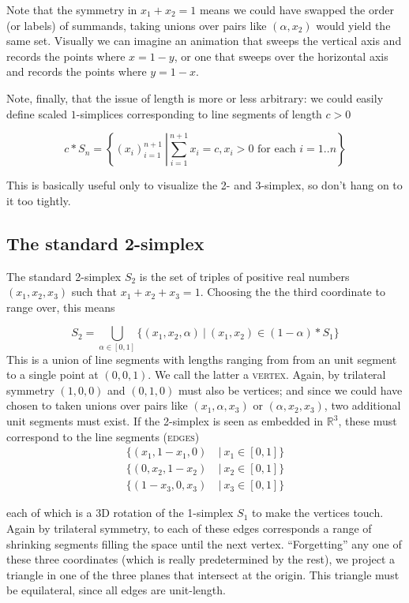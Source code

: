 \documentclass{tufte-handout}
\newcommand{\define}{\textsc}
\newcommand{\re}{\mathbb{R}}
\begin{document}
Note that the symmetry in $x_1+x_2=1$ means we could have swapped the order (or labels) of summands, taking unions over pairs like $(\alpha,x_2)$ would yield the same set. Visually we can imagine an animation that sweeps the vertical axis and records the points where $x=1-y$, or one that sweeps over the horizontal axis and records the points where $y=1-x$.

Note, finally, that the issue of length is more or less arbitrary: we could easily define scaled $1$-simplices corresponding to line segments of length $c>0$
{\[
c * S_n = \left\{(x_i)_{i=1}^{n+1}\ \left| \sum_{i=1}^{n+1} x_i = c\right., x_i > 0 \text{ for each } i=1..n\right\}
\]

This is basically useful only to visualize the 2- and 3-simplex, so don't hang on to it too tightly.
}
\subsection{The standard 2-simplex}
The standard 2-simplex $S_2$ is the set of triples of positive real numbers $(x_1,x_2,x_3)$ such that $x_1+x_2+x_3=1$. Choosing the the third coordinate to range over, this means

\begin{equation}
    S_2 =  \bigcup_{\alpha\in[0,1]} \{(x_1,x_2,\alpha)\ |\ (x_1,x_2)\in (1-\alpha)*S_1\}
    \label{union-view-2}
\end{equation}
This is a union of line segments with lengths ranging from from an unit segment to a single point at $(0,0,1)$. We call the latter a \define{vertex}. Again, by trilateral symmetry $(1,0,0)$ and $(0,1,0)$ must also be vertices; and since we could have chosen to taken unions over pairs like $(x_1, \alpha,x_3)$ or $(\alpha,x_2,x_3)$, two additional unit segments must exist. If the 2-simplex is seen as embedded in $\re^3$, these must correspond to the line segments (\define{edges})
\begin{align*}
\{(x_1,1-x_1,0)\ &|\  x_1\in[0,1]\}\\
\{(0,x_2,1-x_2)\ &|\ x_2 \in[0,1]\}\\
\{(1-x_3,0,x_3)\ &|\ x_3\in[0,1]\}
\end{align*}

each of which is a 3D rotation of the 1-simplex $S_1$ to make the vertices touch. Again by trilateral symmetry, to each of these edges corresponds a range of shrinking segments filling the space until the next vertex. ``Forgetting'' any one of these three coordinates (which is really predetermined by the rest), we project a triangle in one of the three planes that intersect at the origin. This triangle must be equilateral, since all edges are unit-length.
\end{document}
